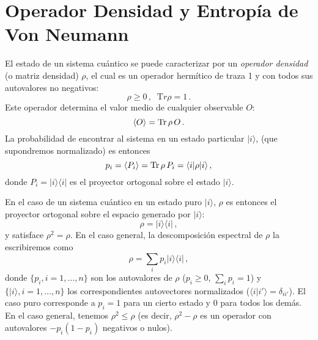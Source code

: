 \section{Operador Densidad y Entropía de Von Neumann}
El estado de un sistema cuántico 
se puede caracterizar por un {\it operador densidad} (o
matriz densidad) $\rho$, el cual es un operador hermítico de traza 1 y con todos sus autovalores no negativos:
\begin{equation}\rho\geq 0\,,\;\;{\mathrm Tr}\rho=1\,.\end{equation}
Este operador determina el valor medio de cualquier observable $O$: 
\begin{equation}\langle O\rangle={\rm Tr}\,\rho\,O\,.\end{equation}
La probabilidad de encontrar al sistema en un estado particular $|i\rangle$,
(que supondremos normalizado) es entonces
\begin{equation}
p_i=\langle P_i\rangle={\rm Tr}\,\rho\,P_i=\langle i|\rho|i\rangle\,,
\end{equation}
donde $P_i=|i\rangle \langle i|$ es el proyector ortogonal sobre el estado $|i\rangle$.

En el caso de un sistema cuántico en un estado puro
$|i\rangle$, $\rho$ es entonces el proyector ortogonal sobre el espacio generado por $|i\rangle$:
\begin{equation}\rho=|i\rangle\langle i|\,,
\end{equation}
y satisface $\rho^2=\rho$. En el caso general, la descomposición espectral de $\rho$ la escribiremos como
\begin{equation}\rho=\sum_i p_i|i\rangle\langle i|\,,\end{equation}
donde $\{p_i,i=1,\ldots,n\}$ %
son los autovalores de $\rho$ ($p_i\geq 0$, $\sum_i p_i=1$) y $\{|i\rangle,i=1,\ldots,n\}$ los
correspondientes autovectores normalizados ($\langle i|i'\rangle=\delta_{ii'}$). El caso puro corresponde a $p_i=1$ para un cierto estado y 0 para todos los demás.
En el caso general, tenemos $\rho^2\leq \rho$ (es decir, $\rho^2-\rho$ es un
operador con autovalores $-p_i(1-p_i)$ negativos o nulos).

